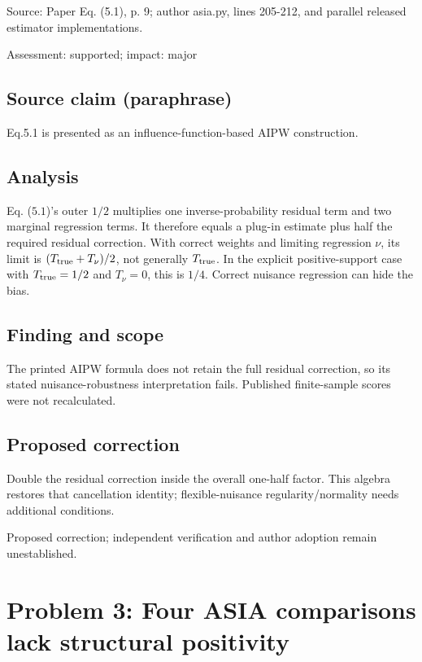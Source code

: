 \documentclass[11pt]{article}
\begin{document}
Source: Paper Eq. (5.1), p. 9; author asia.py, lines 205-212, and parallel released estimator implementations.

Assessment: supported; impact: major

\subsection*{Source claim (paraphrase)}

Eq.5.1 is presented as an influence-function-based AIPW construction.

\subsection*{Analysis}

Eq. (\(5.1\))'s outer \(1/2\) multiplies one inverse-probability residual term and two marginal regression terms. It therefore equals a plug-in estimate plus half the required residual correction. With correct weights and limiting regression \(\nu\), its limit is \((T_{\rm true}+T_\nu)/2\), not generally \(T_{\rm true}\). In the explicit positive-support case with \(T_{\rm true}=1/2\) and \(T_\nu=0\), this is \(1/4\). Correct nuisance regression can hide the bias.

\subsection*{Finding and scope}

The printed AIPW formula does not retain the full residual correction, so its stated nuisance-robustness interpretation fails. Published finite-sample scores were not recalculated.

\subsection*{Proposed correction}

Double the residual correction inside the overall one-half factor. This algebra restores that cancellation identity; flexible-nuisance regularity/normality needs additional conditions.

Proposed correction; independent verification and author adoption remain unestablished.

\section*{Problem 3: Four ASIA comparisons lack structural positivity}
\end{document}
